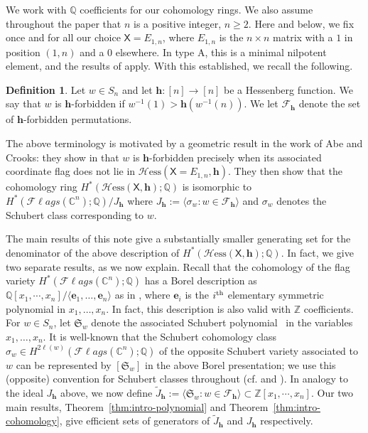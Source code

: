 \documentclass[11pt]{amsart}
\theoremstyle{plain}
\theoremstyle{definition}
\newtheorem{defi}[thm]{Definition}
\newcommand{\Hess}{\mathcal{H}\mathrm{ess}}
\newcommand{\mx}{\mathsf{X}}
\newcommand{\hess}{{\mathbf h}}
\newcommand{\Fl}{\mathcal{F}\ell ags}
\newcommand{\C}{\mathbb{C}}           %
\newcommand{\Z}{\mathbb{ Z}}           %
\newcommand{\Q}{\mathbb{ Q}}           %
\numberwithin{equation}{section}
\begin{document}
We work with $\Q$ coefficients for our cohomology rings. We also assume throughout the paper that $n$ is a positive integer, $n \geq 2$. Here and below, we fix once and for all our choice $\mx = E_{1,n}$, where $E_{1,n}$ is the $n\times n$ matrix with a $1$ in position $(1,n)$ and a $0$ elsewhere. In type A, this is a minimal nilpotent element, and the results of \cite{AbeCrooks} apply. With this established, we recall the following.  


\begin{defi}\label{def:forbidden}
Let $w \in S_n$ and let $\hess: [n] \to [n]$ be a Hessenberg function. We say that $w$ is $\hess$-forbidden if $w^{-1}(1)>\hess(w^{-1}(n))$.  We let $\mathcal{F}_\hess$ denote the set of $\hess$-forbidden permutations. 
\end{defi}

The above terminology is motivated by a geometric result in the work of Abe and Crooks: they show in \cite[Proposition 3]{AbeCrooks} that $w$ is $\hess$-forbidden precisely when its associated coordinate flag does not lie in $\Hess(\mx = E_{1,n},\hess)$. They then show that the cohomology ring $H^*(\Hess(\mx,\hess);\Q)$ is isomorphic to $H^*(\Fl(\C^n);\Q)/J_\hess$ where $J_\hess := \langle \sigma_w: w \in \mathcal{F}_\hess\rangle$ and $\sigma_w$ denotes the Schubert class corresponding to $w$. 

The main results of this note give a substantially smaller generating set for the denominator of the above description of $H^*(\Hess(\mx,\hess);\Q)$. In fact, we give two separate results, as we now explain. Recall that the cohomology of the flag variety $H^*(\Fl(\C^n);\Q)$ has a Borel description as $\Q[x_1,\cdots,x_n]/\langle \mathbf{e}_1,\ldots, \mathbf{e}_n \rangle $ as in \cite{Borel1953}, where $\mathbf{e}_i$ is the $i^{\textnormal{th}}$ elementary symmetric polynomial in $x_1,\ldots, x_n$. In fact, this description is also valid with $\Z$ coefficients. 
For $w\in S_n$, let $\mathfrak{S}_w$ denote the associated Schubert polynomial~\cite{LascouxSchutzenberger1982} in the variables $x_1,\ldots, x_n$. It is well-known that the Schubert cohomology class $\sigma_w\in H^{2\ell(w)}(\Fl(\C^n);\Q)$ of the opposite Schubert variety associated to $w$ can be represented by $[\mathfrak{S}_w]$ in the above Borel presentation; we use this (opposite) convention for Schubert classes throughout (cf. \cite[Part I, Chapter 1]{Handbook-Hess} and \cite{AbeCrooks}). In analogy to the ideal $J_\hess$ above, we now define $\tilde{J}_\hess := \langle \mathfrak{S}_w: w \in \mathcal{F}_\hess\rangle \subset \Z[x_1,\cdots,x_n]$. Our two main results, Theorem~\ref{thm:intro-polynomial} and Theorem~\ref{thm:intro-cohomology}, give efficient sets of generators of $\tilde{J}_\hess$ and $J_\hess$ respectively.  
\end{document}
